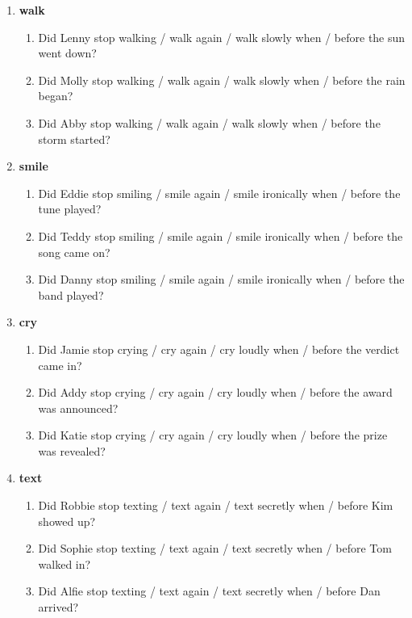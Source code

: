 \documentclass[a4paper,12pt]{article}
\newcommand{\6}{\mbox{$[\hspace*{-.6mm}[$}}
\newcommand{\9}{\mbox{$]\hspace*{-.6mm}]$}}
\begin{document}
\begin{enumerate}[leftmargin=3ex,itemsep=-4pt]
\newpage

\item {\bf walk}
\begin{enumerate}[leftmargin=2ex,itemsep=-4pt]
\item Did Lenny stop walking	/ walk again / walk slowly	when / before the sun went down?
\item Did Molly stop walking / walk again / walk slowly	when / before the rain began?
\item Did Abby stop walking	/  walk again	/ walk slowly when / before the storm started?
\end{enumerate}



\item {\bf smile}
\begin{enumerate}[leftmargin=2ex,itemsep=-4pt]
\item Did Eddie stop smiling / smile again / smile ironically when /	before the tune played?
\item Did Teddy stop smiling / smile again / smile ironically	when / before the song came on?
\item Did Danny stop smiling / smile again	/ smile ironically	when / before the band played?
\end{enumerate}


\item {\bf cry}
\begin{enumerate}[leftmargin=2ex,itemsep=-4pt]
\item Did Jamie stop crying	/ cry again	/ cry loudly when /	before the verdict came in?
\item Did Addy stop crying	/ cry again	/ cry loudly when / before the award was announced?
\item Did Katie stop crying	/ cry again	/ cry loudly when / before the prize was revealed?
\end{enumerate}


\item {\bf text} 
\begin{enumerate}[leftmargin=2ex,itemsep=-4pt]
\item Did Robbie stop texting	/ text again	/ text secretly	when / before Kim showed up?
\item Did Sophie stop texting / text again	/ text secretly	when / before Tom walked in?
\item Did Alfie stop texting  / text again	/ text secretly	when / before Dan arrived?
\end{enumerate}



\end{enumerate}
\end{document}
